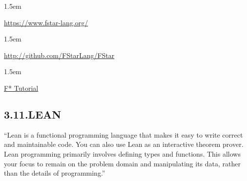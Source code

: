\documentclass[12pt,twoside]{article}
\begin{document}
\begin{mddefinitions}%


\begin{mdbmarginx}{}{}{}{1.5em}%
\begin{mddefdata}%
\href{https://www.fstar-lang.org/}{{\ttfamily https://\hspace{0pt}www.\hspace{0pt}fstar-\hspace{0pt}lang.\hspace{0pt}org/\hspace{0pt}}}
\end{mddefdata}%
\end{mdbmarginx}%


\begin{mdbmarginx}{}{}{}{1.5em}%
\begin{mddefdata}%
\href{http://github.com/FStarLang/FStar}{{\ttfamily http://\hspace{0pt}github.\hspace{0pt}com/\hspace{0pt}FStarLang/\hspace{0pt}FStar}}
\end{mddefdata}%
\end{mdbmarginx}%


\begin{mdbmarginx}{}{}{}{1.5em}%
\begin{mddefdata}%
\href{https://www.fstar-lang.org/tutorial/}{F* Tutorial}%
\end{mddefdata}%
\end{mdbmarginx}%
\end{mddefinitions}%

\subsection{3.11.\hspace*{0.5em}LEAN}%

\noindent{}\textquotedblleft{}Lean is a functional programming language that makes it easy to write
correct and maintainable code. You can also use Lean as an interactive
theorem prover. Lean programming primarily involves defining types and
functions. This allows your focus to remain on the problem domain and
manipulating its data, rather than the details of programming.\textquotedblright{}%
\end{document}
